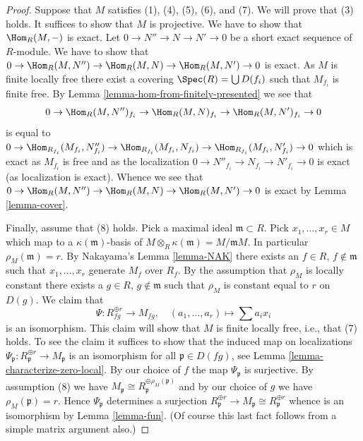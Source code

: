 \begin{proof}
\medskip\noindent
Suppose that $M$ satisfies (1), (4), (5), (6), and (7).
We will prove that (3) holds. It suffices
to show that $M$ is projective. We have to show that $\Hom_R(M, -)$
is exact. Let $0 \to N'' \to N \to N'\to 0$ be a short exact sequence of
$R$-module. We have to show that
$0 \to \Hom_R(M, N'') \to \Hom_R(M, N) \to
\Hom_R(M, N') \to 0$ is exact.
As $M$ is finite locally free there exist a covering
$\Spec(R) = \bigcup D(f_i)$ such that $M_{f_i}$ is finite free.
By
Lemma \ref{lemma-hom-from-finitely-presented}
we see that
$$
0 \to \Hom_R(M, N'')_{f_i} \to \Hom_R(M, N)_{f_i} \to
\Hom_R(M, N')_{f_i} \to 0
$$
is equal to
$0 \to \Hom_{R_{f_i}}(M_{f_i}, N''_{f_i}) \to
\Hom_{R_{f_i}}(M_{f_i}, N_{f_i}) \to
\Hom_{R_{f_i}}(M_{f_i}, N'_{f_i}) \to 0$
which is exact as $M_{f_i}$ is free and as the localization
$0 \to N''_{f_i} \to N_{f_i} \to N'_{f_i} \to 0$
is exact (as localization is exact). Whence we see that
$0 \to \Hom_R(M, N'') \to \Hom_R(M, N) \to
\Hom_R(M, N') \to 0$ is exact by
Lemma \ref{lemma-cover}.

\medskip\noindent
Finally, assume that (8) holds. Pick a maximal ideal $\mathfrak m \subset R$.
Pick $x_1, \ldots, x_r \in M$ which map to a $\kappa(\mathfrak m)$-basis of
$M \otimes_R \kappa(\mathfrak m) = M/\mathfrak mM$. In particular
$\rho_M(\mathfrak m) = r$. By
Nakayama's Lemma \ref{lemma-NAK}
there exists an $f \in R$, $f \not \in \mathfrak m$ such that
$x_1, \ldots, x_r$ generate $M_f$ over $R_f$. By the assumption that
$\rho_M$ is locally constant there exists a $g \in R$, $g \not \in \mathfrak m$
such that $\rho_M$ is constant equal to $r$ on $D(g)$. We claim that
$$
\Psi : R_{fg}^{\oplus r} \longrightarrow M_{fg}, \quad
(a_1, \ldots, a_r) \longmapsto \sum a_i x_i
$$
is an isomorphism. This claim will show that $M$ is finite locally
free, i.e., that (7) holds. To see the claim
it suffices to show that the induced map on localizations
$\Psi_{\mathfrak p} : R_{\mathfrak p}^{\oplus r} \to M_{\mathfrak p}$
is an isomorphism for all $\mathfrak p \in D(fg)$, see
Lemma \ref{lemma-characterize-zero-local}.
By our choice of $f$ the map $\Psi_{\mathfrak p}$
is surjective. By assumption (8) we have
$M_{\mathfrak p} \cong R_{\mathfrak p}^{\oplus \rho_M(\mathfrak p)}$
and by our choice of $g$ we have $\rho_M(\mathfrak p) = r$.
Hence $\Psi_{\mathfrak p}$ determines a surjection
$R_{\mathfrak p}^{\oplus r} \to
M_{\mathfrak p} \cong R_{\mathfrak p}^{\oplus r}$
whence is an isomorphism by
Lemma \ref{lemma-fun}.
(Of course this last fact follows from a simple matrix argument also.)
\end{proof}
